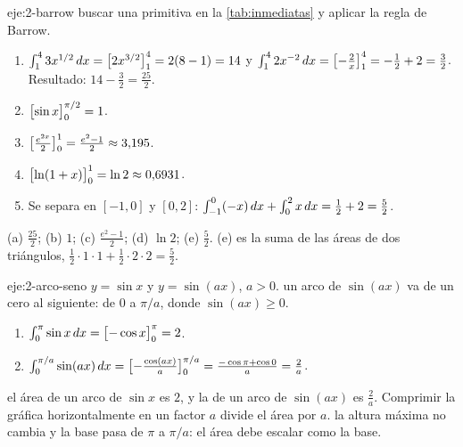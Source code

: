 \begin{solucion}{eje:2-barrow}
\planteamiento buscar una primitiva en la \cref{tab:inmediatas} y aplicar la regla de Barrow.
\pasos
\begin{enumerate}[label=(\alph*)]
  \item $\int_1^{4}3x^{1/2}\mathop{}\!d x=\bigl[2x^{3/2}\bigr]_{1}^{4}=2(8-1)=14$ y $\int_1^{4}2x^{-2}\mathop{}\!d x=\bigl[-\frac2x\bigr]_{1}^{4}=-\frac12+2=\frac32$. Resultado: $14-\frac32=\frac{25}{2}$.
  \item $\bigl[\sin x\bigr]_{0}^{\pi/2}=1$.
  \item $\bigl[\frac{e^{2x}}{2}\bigr]_{0}^{1}=\frac{e^{2}-1}{2}\approx3{,}195$.
  \item $\bigl[\ln(1+x)\bigr]_{0}^{1}=\ln2\approx0{,}6931$.
  \item Se separa en $[-1,0]$ y $[0,2]$: $\int_{-1}^{0}(-x)\mathop{}\!d x+\int_0^{2}x\mathop{}\!d x=\frac12+2=\frac52$.
\end{enumerate}
\resultado (a) $\frac{25}{2}$; (b) $1$; (c) $\frac{e^{2}-1}{2}$; (d) $\ln2$; (e) $\frac52$.
\comprobacion (e) es la suma de las áreas de dos triángulos, $\frac12\cdot1\cdot1+\frac12\cdot2\cdot2=\frac52$.
\end{solucion}

\begin{solucion}{eje:2-arco-seno}
\datos $y=\sin x$ y $y=\sin(ax)$, $a>0$.
\planteamiento un arco de $\sin(ax)$ va de un cero al siguiente: de $0$ a $\pi/a$, donde $\sin(ax)\ge0$.
\pasos
\begin{enumerate}[label=\arabic*.]
  \item $\int_0^{\pi}\sin x\mathop{}\!d x=\bigl[-\cos x\bigr]_{0}^{\pi}=2$.
  \item $\int_0^{\pi/a}\sin(ax)\mathop{}\!d x=\bigl[-\frac{\cos(ax)}{a}\bigr]_{0}^{\pi/a}=\frac{-\cos\pi+\cos0}{a}=\frac2a$.
\end{enumerate}
\resultado el área de un arco de $\sin x$ es $2$, y la de un arco de $\sin(ax)$ es $\frac2a$. Comprimir la gráfica horizontalmente en un factor $a$ divide el área por $a$.
\comprobacion la altura máxima no cambia y la base pasa de $\pi$ a $\pi/a$: el área debe escalar como la base.
\end{solucion}

